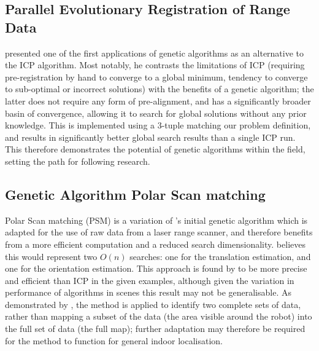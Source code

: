 \documentclass[authoryearcitations]{UoYCSproject}
\begin{document}
\subsection{Parallel Evolutionary Registration of Range Data}
\citet{Robertson2002-ou} presented one of the first applications of genetic algorithms as an alternative to the ICP algorithm. Most notably, he contrasts the limitations of ICP (requiring pre-registration by hand to converge to a global minimum, tendency to converge to sub-optimal or incorrect solutions) with the benefits of a genetic algorithm; the latter does not require any form of pre-alignment, and has a significantly broader basin of convergence, allowing it to search for global solutions without any prior knowledge. This is implemented using a 3-tuple matching our problem definition, and results in significantly better global search results than a single ICP run. This therefore demonstrates the potential of genetic algorithms within the field, setting the path for following research.

\subsection{Genetic Algorithm Polar Scan matching}
Polar Scan matching (PSM) is a variation of \citeauthor{Robertson2002-ou}'s initial genetic algorithm which is adapted for the use of raw data from a laser range scanner, and therefore benefits from a more efficient computation and a reduced search dimensionality. \citet{Ze-Su2007-li} believes this would represent two $O(n)$ searches: one for the translation estimation, and one for the orientation estimation. This approach is found by \citeauthor{Ze-Su2007-li} to be more precise and efficient than ICP in the given examples, although given the variation in performance of algorithms in scenes \cite{Donoso2017-wp} this result may not be generalisable. As demonstrated by \citeauthor{Ze-Su2007-li}, the method is applied to identify two complete sets of data, rather than mapping a subset of the data (the area visible around the robot) into the full set of data (the full map); further adaptation may therefore be required for the method to function for general indoor localisation.
\end{document}

